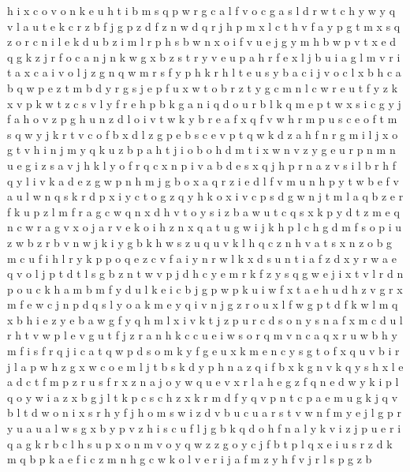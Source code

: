 \documentclass{article}
\begin{document}
h i x c o
v o n k e u h t i b m s q p w r g c a l f
v o c g a s l d
r w t c h y
w y q v l a u t e k c r z b f j g
p z d
f z n w d q r j h p m x l c t
h v f a y p g t m x s q z o r c n i l e k d u b
z i m
l r p h s b w n x o i f v u e j g
y m h b w p v t x e d q g k z j r f o c a n
j n k w g x b z s t r y v e u p a
h r f e x l j b u i a g
l m v r i t a
x c a i v o l j z g n q w m r s f y p h
k r h l t e u s y b a c i j
v o c l x b
h c a b q w p e z t
m b d y r g s j e p f u x w t o
b r z t y g c
m n l c w r e u t f y z k x v
p k w
t z c s v l y f r e h p b k g a n i q d o
u r b l k q m e p t w x s i c g y j f a h o v z
p g h u n z d l o i v t w k y b r e a f x q
f v w h r m p u s
c e o f t m s
q w y j k r t v c o f b x d l z g p e
b s c e v p t q w k d z a h f n r g m i l j x o
g t v h i n j m y q k u z b p a
h t j i o
b o h d m t i x w n v z y g e u r p
n m
n u e g i z s a v
j h k l y o f r q c x n p
i v a b d e s x q j h p r n
a z v s i l b r h f q
y l i v k a d e z g w p n h m
j g b o x a q r z i e d l f v m u n h p y t w
b e f v a u l w n q s k r d p x i y c t o g z
q
y h k o x i v c p s d g w n j t m l a q b z e r f
k u p z l m f r a g c w q n x d h v t o y s i
z b a w u t c q s x k
p y d t z m e q n c w r a g v x o j
a r v e k o i h z n x q
a
t u g w i j k h p l c
h g d m f s o p i u z w
b z
r b v n w j k
i y g b k h w s z u q
u v k l h
q c z n h
v a t s x n z o b g m c u f i h l r y k p
p o q e z c v f a i y n r w l k x d s u
n t i a
f z d x y r w a e q v o l j p t
d t
l s g b z n t w v p j d h c y e m r k
f z y s q g w e j i x t v l r d n p o u c k h a m b
m f y d u l k e i c b j g p w
p k u i w f x t a e h
u d
h z v g r x m f e w c j n p d q s l y o a k
m e y q i v n j g z r o u x l f w
g p t d f k w l m q x b h i e z y
e b a w g f y q h m l x i v k t j z p u r c d s o n
y s n a f x m c d u l r h t v
w p l e v g u t f j z r a n h k c
c
u e i w s o r q m v n
c a q x r u w b h y m f i
s f r q j i
c a t q w p d s o m k y f g e u x
k m e n c y s g t o f x q u v b i r j l a p w h z
g x w c o e m l j t b s k d y p h n a z q i
f b x k
g n v k q y s h x l e a d c t f m p z r u
s f r x z n a j o y w q u e
v x r l a h e g z f q
n e d w y k i p l
q o y w i a z x b g j l t k p c s
c h z x k r m d f y q v p n t
c p a e m u g k j q v b l t d w o n i x s r h y f
j h o m s w i z d v b u c
u a r s t v w n f m y e j l g p
r y u a
u a
l w s g x b y p v z h i
s c u f l j g b k q d o
h f n a l y k v i z j p u e r
i q a g k r b c l h s u p x o n m v
o y q w z
z
g o y c j f b t p l q x e i u s r z d k m
q b p k a e f i c z m n h
g c w k o l v e r i j a f m z y h
f v j r l s p g z b
\end{document}
